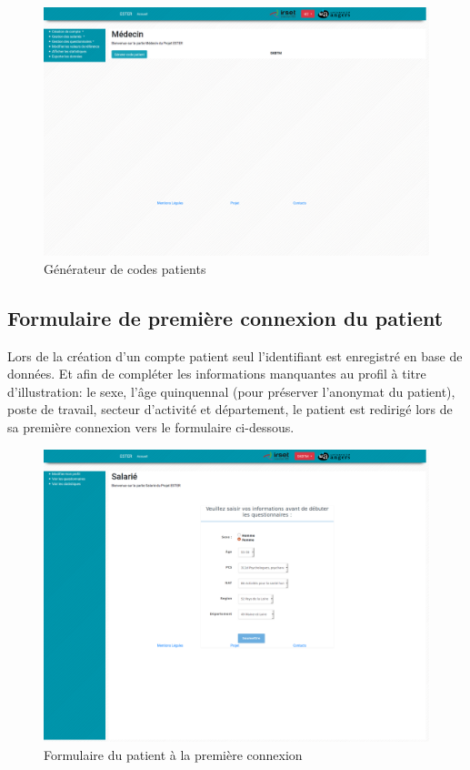 \begin{figure}[H]
    \begin{center}
	\includegraphics[scale=0.25]{img/connexion/medecin}
    \end{center}
    \caption{Générateur de codes patients}
\end{figure}

\subsection{Formulaire de première connexion du patient}

Lors de la création d’un compte patient seul l’identifiant est enregistré en base de données. Et afin de compléter les informations manquantes au profil à titre d'illustration: le sexe, l’âge quinquennal (pour préserver l’anonymat du patient), poste de travail, secteur d’activité et département, le patient est redirigé lors de sa première connexion vers le formulaire ci-dessous.

\begin{figure}[H]
    \begin{center}
	\includegraphics[scale=0.25]{img/connexion/formPatient}
    \end{center}
    \caption{Formulaire du patient à la première connexion}
\end{figure}
